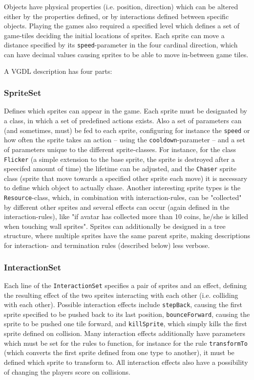 \documentclass[a4paper,titlepage,final]{report}
\begin{document}
Objects have physical properties (i.e. position, direction) which can be altered either by the properties defined, or by interactions defined between specific objects. 
Playing the games also required a specified level which defines a set of game-tiles deciding the initial locations of sprites. 
Each sprite can move a distance specified by its \texttt{speed}-parameter in the four cardinal direction, which can have decimal values causing sprites to be able to move in-between game tiles.

A VGDL description has four parts: 


\subsubsection*{SpriteSet}
Defines which sprites can appear in the game. Each sprite must be designated by a class, in which a set of predefined actions exists. Also a set of parameters can (and sometimes, must) be fed to each sprite, configuring for instance the \texttt{speed} or how often the sprite takes an action -- using the \texttt{cooldown}-parameter -- and a set of parameters unique to the different sprite-classes.
For instance, for the  class \texttt{Flicker} (a simple extension to the base sprite, the sprite is destroyed after a speecifed amount of time) the lifetime can be adjusted, and the \texttt{Chaser} sprite class (sprite that move towards a specified other sprite each move) it is necessary to define which object to actually chase.
Another interesting sprite types is the \texttt{Resource}-class, which, in combination with interaction-rules, can be "collected" by different other sprites and several effects can occur (again defined in the interaction-rules), like "if avatar has collected more than 10 coins, he/she is killed when touching wall sprites".
Sprites can additionally be designed in a tree structure, where multiple sprites have the same parent sprite, making descriptions for interaction- and termination rules (described below) less verbose. 

\subsubsection*{InteractionSet}
Each line of the \texttt{InteractionSet} specifies a pair of sprites and an effect, defining the resulting effect of the two sprites interacting with each other (i.e. colliding with each other).
Possible interaction effects include \texttt{stepBack}, causing the first sprite specified to be pushed back to its last position, \texttt{bounceForward}, causing the sprite to be pushed one tile forward, and \texttt{killSprite}, which simply kills the first sprite defined on collision.
Many interaction effects additionally have parameters which must be set for the rules to function, for instance for the rule \texttt{transformTo} (which converts the first sprite defined from one type to another), it must be defined which sprite to transform to.
All interaction effects also have a possibility of changing the players score on collisions.
\end{document}
